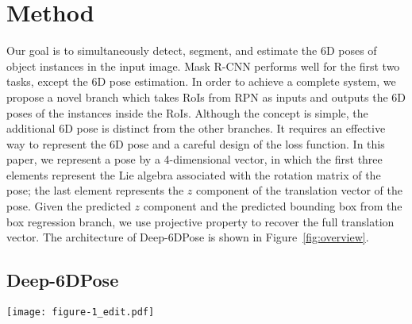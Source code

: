 \documentclass[conference]{IEEEtran}
\newcommand{\method}[1]{Deep-6DPose}
\begin{document}
\section{Method}\label{sec:method}%
Our goal is to simultaneously detect, segment, and estimate the 6D poses of object instances in the input image. 
Mask R-CNN performs well for the first two tasks, except the 6D pose estimation. In order to achieve a complete system, we propose a novel branch which takes RoIs from RPN as inputs and outputs the 6D poses of the instances inside the RoIs. %
Although the concept is simple, the additional 6D pose is distinct from the other branches. It requires an effective way to represent the 6D pose and a careful design of the loss function. 
In this paper, we represent a pose by a 4-dimensional vector, in which the first three elements represent the Lie algebra associated with the rotation matrix of the pose; the last element represents the $z$ component of the translation vector of the pose. Given the predicted $z$ component and the predicted bounding box from the box regression branch, we use projective property to recover the full translation vector. The architecture of \method{} is shown in Figure~\ref{fig:overview}.

\subsection{\method{}}\begin{figure*}[!t] 
\centering   				
\texttt{[image: figure-1\_edit.pdf]}    
    \caption{An overview of \method{} framework. {From left to right:} The input to \method{} is a RGB image. A deep CNN backbone (i.e., VGG) is used to extract features over the whole image. The RPN is attached on the last convolutional layer of VGG (i.e., $conv5\_3$) and outputs RoIs. For each RoI, the corresponding features from the feature map $conv5\_3$ are extracted and pooled into a fixed size $7\times 7$. The pooled features are used as inputs for $4$ head branches. For the box regression and classification heads, we follow Mask-RCNN~\cite{Mask-RCNN}. The segmentation head is \textit{adapted} from~\cite{Mask-RCNN}, i.e., four $3\times3$ consecutive convolutional layers (denoted as `$\times4$') are used. The ReLu is used after each convolutional layer. A deconvolutional layer is used to upsample the feature map to $28\times28$ which is the segmentation mask. The proposed pose head consists of four fully connected layers. The ReLu is used after each of the first three fully connected layers. The last fully connected layer outputs four numbers which represent for the pose. As shown on the right image, the network outputs the detected instances (with classes, i.e., Shampoo), the predicted segmentation masks (different object instances are shown with different colors) and the predicted 6D poses for detected instances (shown with 3D boxes). %
}
    \label{fig:overview} 
\end{figure*}
\end{document}
